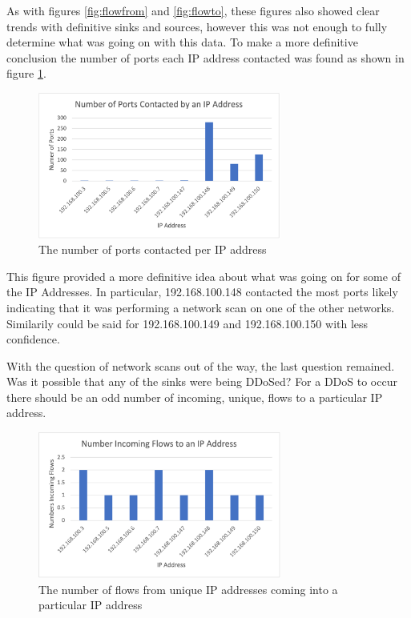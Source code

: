 \documentclass[conference]{IEEEtran}
\begin{document}
As with figures \ref{fig:flowfrom} and \ref{fig:flowto}, these figures also showed clear trends with definitive
sinks and sources, however this was not enough to fully determine what was going on with this data. To make a more
definitive conclusion the number of ports each IP address contacted was found as shown in figure \ref{fig:portscontacted}.

\begin{figure}[htbp]
    \includegraphics[width=8cm]{Figure5.png}
    \centering
    \caption{The number of ports contacted per IP address}
    \label{fig:portscontacted}
\end{figure}

This figure provided a more definitive idea about what was going on for some of the IP Addresses. In particular,
192.168.100.148 contacted the most ports likely indicating that it was performing a network scan on one of the
other networks. Similarily could be said for 192.168.100.149 and 192.168.100.150 with less confidence.

With the question of network scans out of the way, the last question remained.
Was it possible that any of the sinks were being DDoSed?
For a DDoS to occur there should be an odd number of incoming, unique, flows to a particular IP address. 

\begin{figure}[htbp]
    \includegraphics[width=8cm]{Figure6.png}
    \centering
    \caption{The number of flows from unique IP addresses coming into a particular IP address}
    \label{fig:incomingflows}
\end{figure}
\end{document}

